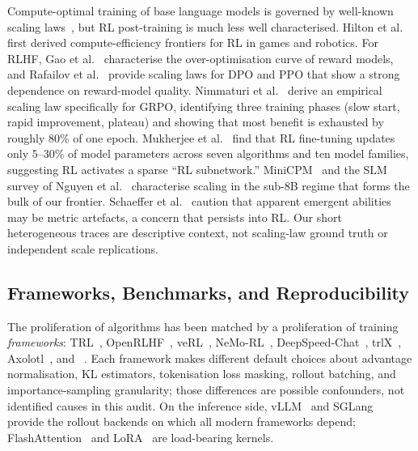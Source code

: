 Compute-optimal training of base language models is governed by
well-known scaling laws~\cite{kaplan2020scalinglaws, hoffmann2022chinchilla, muennighoff2023datascaling}, but RL post-training is much less well
characterised. Hilton et al.~\cite{hilton2023rlscaling} first derived
compute-efficiency frontiers for RL in games and robotics. For RLHF,
Gao et al.~\cite{gao2023reward} characterise the over-optimisation curve of
reward models, and Rafailov et al.~\cite{rafailov2024rlhfscaling} provide
scaling laws for DPO and PPO that show a strong dependence on reward-model
quality. Nimmaturi et al.~\cite{nimmaturi2025predictive} derive an
empirical scaling law specifically for GRPO, identifying three training
phases (slow start, rapid improvement, plateau) and showing that most
benefit is exhausted by roughly $80\%$ of one epoch. Mukherjee et
al.~\cite{liu2025rlsubnetworks} find that RL fine-tuning updates only
$5$--$30\%$ of model parameters across seven algorithms and ten model
families, suggesting RL activates a sparse ``RL subnetwork.''
MiniCPM~\cite{hu2024minicpm} and the SLM survey of
Nguyen et al.~\cite{subramanian2025slm} characterise scaling in the
sub-8B regime that forms the bulk of our frontier. Schaeffer et
al.~\cite{schaeffer2024emergent} caution that apparent emergent abilities may
be metric artefacts, a concern that persists into RL. Our short heterogeneous traces are descriptive context, not scaling-law
ground truth or independent scale replications.

\subsection{Frameworks, Benchmarks, and Reproducibility}
\label{sec:related:frameworks}

The proliferation of algorithms has been matched by a proliferation of
training \emph{frameworks}: TRL~\cite{vonwerra2022trl},
OpenRLHF~\cite{hu2024openrlhf}, veRL~\cite{sheng2024verl},
NeMo-RL~\cite{nvidia2024nemorl}, DeepSpeed-Chat~\cite{yao2023deepspeedchat},
trlX~\cite{havrilla2023trlx}, Axolotl~\cite{axolotl2024}, and
\tinker{}~\cite{thinkingmachines2024tinker}. Each framework makes different
default choices about advantage normalisation, KL estimators, tokenisation
loss masking, rollout batching, and importance-sampling granularity; those
differences are possible confounders, not identified causes in this audit.
On the inference side, vLLM~\cite{kwon2023vllm} and
SGLang~\cite{zheng2024sglang} provide the rollout backends on which all
modern frameworks depend; FlashAttention~\cite{dao2022flashattention} and
LoRA~\cite{hu2022lora} are load-bearing kernels.

